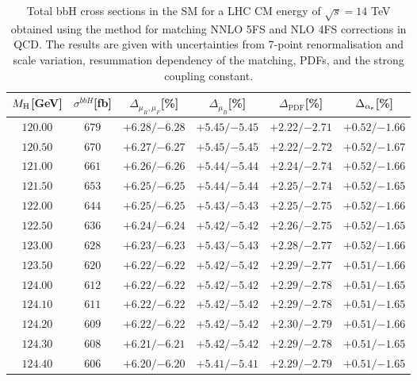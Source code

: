 \begin{table}[ht!]
\caption{Total bbH{} cross sections in the SM for a LHC CM energy of $\sqrt{s}=14$ TeV obtained using the \nlonnllpart{} method for matching NNLO 5FS and NLO 4FS corrections in QCD. The results are given with uncertainties from 7-point renormalisation and scale variation, resummation dependency of the matching, PDFs, and the strong coupling constant.}
\label{tab:bbH14}
\begin{center}%
\begin{small}%
\begin{tabular}{cccccc}%
\toprule
$M_\mathrm{H}$[GeV] & $\sigma^{bbH}$[fb] & $\Delta_{\mu_{R},\mu_{F}}$[\%] & $\Delta_{\mu_{B}}$[\%] & $\Delta_{\mathrm{PDF}}$[\%] & $\Delta_{\alpha_{\mathrm{s}}}$[\%] \\
\midrule
$120.00$ & $679$ & ${+6.28}/{-6.28}$ & ${+5.45}/{-5.45}$ & ${+2.22}/{-2.71}$ & ${+0.52}/{-1.66}$ \\
$120.50$ & $670$ & ${+6.27}/{-6.27}$ & ${+5.45}/{-5.45}$ & ${+2.22}/{-2.72}$ & ${+0.52}/{-1.67}$ \\
$121.00$ & $661$ & ${+6.26}/{-6.26}$ & ${+5.44}/{-5.44}$ & ${+2.24}/{-2.74}$ & ${+0.52}/{-1.66}$ \\
$121.50$ & $653$ & ${+6.25}/{-6.25}$ & ${+5.44}/{-5.44}$ & ${+2.25}/{-2.74}$ & ${+0.52}/{-1.65}$ \\
$122.00$ & $644$ & ${+6.25}/{-6.25}$ & ${+5.43}/{-5.43}$ & ${+2.25}/{-2.75}$ & ${+0.52}/{-1.66}$ \\
$122.50$ & $636$ & ${+6.24}/{-6.24}$ & ${+5.42}/{-5.42}$ & ${+2.26}/{-2.75}$ & ${+0.52}/{-1.65}$ \\
$123.00$ & $628$ & ${+6.23}/{-6.23}$ & ${+5.43}/{-5.43}$ & ${+2.28}/{-2.77}$ & ${+0.52}/{-1.66}$ \\
$123.50$ & $620$ & ${+6.22}/{-6.22}$ & ${+5.42}/{-5.42}$ & ${+2.29}/{-2.77}$ & ${+0.51}/{-1.66}$ \\
$124.00$ & $612$ & ${+6.22}/{-6.22}$ & ${+5.42}/{-5.42}$ & ${+2.29}/{-2.78}$ & ${+0.51}/{-1.65}$ \\
$124.10$ & $611$ & ${+6.22}/{-6.22}$ & ${+5.42}/{-5.42}$ & ${+2.29}/{-2.78}$ & ${+0.51}/{-1.65}$ \\
$124.20$ & $609$ & ${+6.22}/{-6.22}$ & ${+5.42}/{-5.42}$ & ${+2.30}/{-2.79}$ & ${+0.51}/{-1.66}$ \\
$124.30$ & $608$ & ${+6.21}/{-6.21}$ & ${+5.42}/{-5.42}$ & ${+2.29}/{-2.78}$ & ${+0.51}/{-1.65}$ \\
$124.40$ & $606$ & ${+6.20}/{-6.20}$ & ${+5.41}/{-5.41}$ & ${+2.29}/{-2.79}$ & ${+0.51}/{-1.65}$ \\

\end{tabular}
\end{small}
\end{center}
\end{table}
